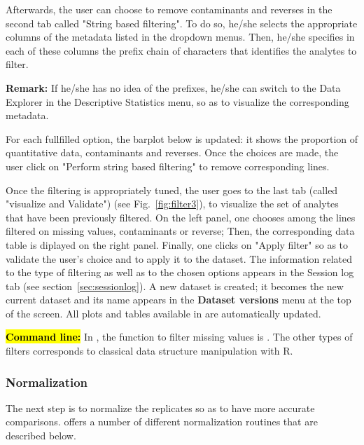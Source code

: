 \documentclass[12pt]{article}
\begin{document}
Afterwards, the user can choose to remove contaminants and reverses in the second tab called "String based filtering". To do so, he/she selects the appropriate columns of the metadata listed in the dropdown menus. Then, he/she specifies in each of these columns the prefix chain of characters that identifies the analytes to filter.

\textbf{Remark:} If he/she has no idea of the prefixes, he/she can switch to the Data Explorer in the Descriptive Statistics menu, so as to visualize the corresponding metadata. 

For each fullfilled option, the barplot below is updated: it shows the proportion of quantitative data, contaminants and reverses. Once the choices are made, the user click on "Perform string based filtering" to remove corresponding lines.

{Once the filtering is appropriately tuned, the user goes to the last tab (called "visualize and Validate") (see Fig.~\ref{fig:filter3}), to visualize the set of analytes that have been previously filtered. On the left panel, one chooses among the lines filtered on missing values, contaminants or reverse; Then, the corresponding data table is diplayed on the right panel. Finally, one clicks on "Apply filter" so as to validate the user's choice and to apply it to the dataset. The information related to the type of filtering as well as to the chosen options appears in the Session log tab (see section~\ref{sec:sessionlog}). A new dataset is created; it becomes the new current dataset and its name appears in the \textbf{Dataset versions} menu at the top of the screen. All plots and tables available in  are automatically updated.}

\hl{\bf Command line:} In , the function to filter missing values is . The other types of filters corresponds to classical data structure manipulation with R.


\subsubsection{Normalization}\label{sec:normalization}

The next step is to normalize the replicates so as to have more accurate comparisons.  offers a number of different normalization routines that are described below.
\end{document}
